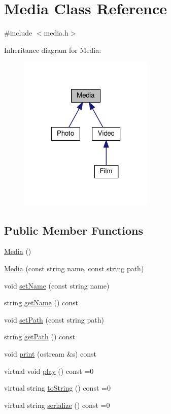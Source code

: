 \hypertarget{classMedia}{}\section{Media Class Reference}
\label{classMedia}


{\ttfamily \#include $<$media.\+h$>$}



Inheritance diagram for Media\+:\nopagebreak
\begin{figure}[H]
\begin{center}
\leavevmode
\includegraphics[width=182pt]{classMedia__inherit__graph}
\end{center}
\end{figure}
\subsection*{Public Member Functions}
\begin{DoxyCompactItemize}
\item 
\hyperlink{classMedia_a6e2ee1b8da6d724fb40a00ff4101d2df}{Media} ()
\item 
\hyperlink{classMedia_a0fcf9ae69f2d91790f3a1092dd867b91}{Media} (const string name, const string path)
\item 
void \hyperlink{classMedia_a51029a762fb97348c2accde515d10ff2}{set\+Name} (const string name)
\item 
string \hyperlink{classMedia_a6593900eea85ce823c5acad032339a1e}{get\+Name} () const 
\item 
void \hyperlink{classMedia_a309c0af39281e4621c5d32872008a2d7}{set\+Path} (const string path)
\item 
string \hyperlink{classMedia_ad2cbd7dec789109234a5db001a75153e}{get\+Path} () const 
\item 
void \hyperlink{classMedia_a62c3a585e2d7f5d0b8bb9617d8b4c3f5}{print} (ostream \&s) const 
\item 
virtual void \hyperlink{classMedia_aabbaa8413a9eeaccc649f9c3068ddbc6}{play} () const =0
\item 
virtual string \hyperlink{classMedia_a95c1c019e23c2e365af1e5093d5232ac}{to\+String} () const =0
\item 
virtual string \hyperlink{classMedia_ae588d20c062218e43b084da08f2dc5c6}{serialize} () const =0
\end{DoxyCompactItemize}
